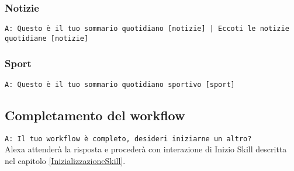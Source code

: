 \subsubsection{Notizie}
\texttt{A: Questo è il tuo sommario quotidiano [notizie] | Eccoti le notizie quotidiane [notizie]}

\subsubsection{Sport}
\texttt{A: Questo è il tuo sommario quotidiano sportivo [sport]}

\begin{comment}
\item da qua in poi desiderabili
\subsubsection{Stock and Crypto}
\subsubsection{Spotify}
\subsubsection{Send tweet}
\item da qua in poi facoltativi
\subsubsection{Timer}
\subsubsection{Radio}
\subsubsection{Modify calendar}
\subsubsection{Youtube}
\subsubsection{Read Telegram}
\subsubsection{Send voice note Telegram}
\subsubsection{Send text Telegram}
\subsubsection{Reply mail}
\subsubsection{Reply tweet}
\end{comment}

\subsection{Completamento del workflow}
\texttt{A: Il tuo workflow è completo, desideri iniziarne un altro?}\\
Alexa attenderà la risposta e procederà con interazione di Inizio Skill descritta nel capitolo \ref{InizializzazioneSkill}.
